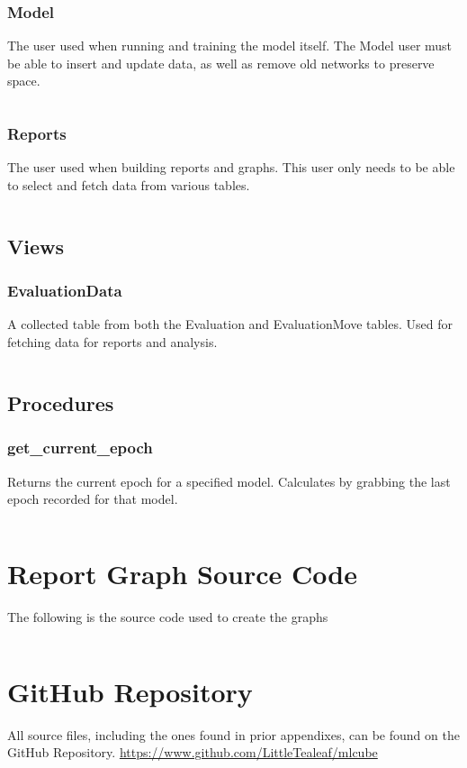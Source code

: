 \documentclass[12pt]{article}
\begin{document}
\subsubsection{Model}

The user used when running and training the model itself. The Model user must be able to insert and update data, as well as remove old networks to preserve space.

\inputminted{SQL}{../../sql/users/model.sql}

\subsubsection{Reports}

The user used when building reports and graphs. This user only needs to be able to select and fetch data from various tables.

\inputminted{SQL}{../../sql/users/reports.sql}

\subsection{Views}

\subsubsection{EvaluationData}

A collected table from both the Evaluation and EvaluationMove tables. Used for fetching data for reports and analysis.

\inputminted{SQL}{../../sql/views/EvaluationData.sql}

\subsection{Procedures}

\subsubsection{get\_current\_epoch}

Returns the current epoch for a specified model. Calculates by grabbing the last epoch recorded for that model.

\inputminted{SQL}{../../sql/procedures/get_current_epoch.sql}

\newpage

\section{Report Graph Source Code}

The following is the source code used to create the graphs

\inputminted{R}{../scripts/SER-300-Report.R}

\newpage

\section{GitHub Repository}

All source files, including the ones found in prior appendixes, can be found on the GitHub Repository. \url{https://www.github.com/LittleTealeaf/mlcube}
\end{document}
